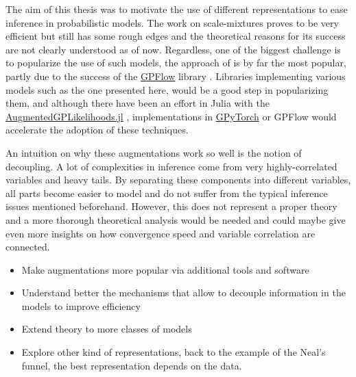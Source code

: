 

\graphicspath{{9_conclusion/figures/}}

The aim of this thesis was to motivate the use of different representations to ease inference in probabilistic models.
The work on scale-mixtures proves to be very efficient but still has some rough edges and the theoretical reasons for its success are not clearly understood as of now.
Regardless, one of the biggest challenge is to popularize the use of such models, the approach of \citet{Hensman2015} is by far the most popular, partly due to the success of the \href{https://github.com/GPflow/GPflow}{GPFlow} library \cite{GPflow2017}.
Libraries implementing various models such as the one presented here, would be a good step in popularizing them, and although there have been an effort in Julia with the \href{https://github.com/JuliaGaussianProcesses/AugmentedGPLikelihoods.jl}{AugmentedGPLikelihoods.jl} \cite{theo_galy_fajou_2022_6347022}, implementations in \href{https://gpytorch.ai/}{GPyTorch} \cite{gardner2018gpytorch} or GPFlow would accelerate the adoption of these techniques.

An intuition on why these augmentations work so well is the notion of decoupling.
A lot of complexities in inference come from very highly-correlated variables and heavy tails.
By separating these components into different variables, all parts become easier to model and do not suffer from the typical inference issues mentioned beforehand.
However, this does not represent a proper theory and a more thorough theoretical analysis would be needed and could maybe give even more insights on how convergence speed and variable correlation are connected.

\begin{itemize}
    \item Make augmentations more popular via additional tools and software
    \item Understand better the mechanisms that allow to decouple information in the models to improve efficiency
    \item Extend theory to more classes of models
    \item Explore other kind of representations, back to the example of the Neal's funnel, the best representation depends on the data.
\end{itemize}



